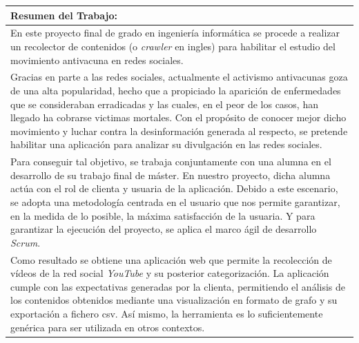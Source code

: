 \documentclass[11pt,a4paper]{article}
\begin{document}
\begin{tabularx}{\textwidth}{|X|}
\textbf{Resumen del Trabajo:} \\ 
\hline 
\cellcolor{gray!25}
\medskip
En este proyecto final de grado en ingeniería informática se procede a realizar un recolector de contenidos (o \textit{crawler} en ingles) para habilitar el estudio del movimiento antivacuna en redes sociales.
\\
\medskip 
\cellcolor{gray!25}
Gracias en parte a las redes sociales, actualmente el activismo antivacunas goza de una alta popularidad, hecho que a propiciado la aparición de enfermedades que se consideraban erradicadas y las cuales, en el peor de los casos, han llegado ha cobrarse victimas mortales. Con el propósito de conocer mejor dicho movimiento y luchar contra la desinformación generada al respecto, se pretende habilitar una aplicación para analizar su divulgación en las redes sociales.
\\
\medskip 
\cellcolor{gray!25}
Para conseguir tal objetivo, se trabaja conjuntamente con una alumna en el desarrollo de su trabajo final de máster. En nuestro proyecto, dicha alumna actúa con el rol de clienta y usuaria de la aplicación. Debido a este escenario, se adopta una metodología centrada en el usuario que nos permite garantizar, en la medida de lo posible, la máxima satisfacción de la usuaria. Y para garantizar la ejecución del proyecto, se aplica el marco ágil de desarrollo \textit{Scrum}.
\\
\medskip 
\cellcolor{gray!25}
Como resultado se obtiene una aplicación web que permite la recolección de vídeos de la red social \textit{YouTube} y su posterior categorización. La aplicación cumple con las expectativas generadas por la clienta, permitiendo el análisis de los contenidos obtenidos mediante una visualización en formato de grafo y su exportación a fichero csv. Así mismo, la herramienta es lo suficientemente genérica para ser utilizada en otros contextos.
\medskip 
\\
\hline 
\end{tabularx} 
\newpage 
\end{document}
